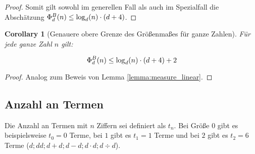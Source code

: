 \documentclass{article}
\newtheorem{corollary}{Corollary}[theorem]
\theoremstyle{nonumberplain}
\newtheorem{proof}{Beweis}
\begin{document}
\begin{proof}
Somit gilt sowohl im generellen Fall als auch im Spezialfall die Abschätzung \(\Phi_{d}^{B}(n) \leq \log_d(n) \cdot (d+4)\).
\end{proof}

\begin{corollary}[Genauere obere Grenze des Größenmaßes für ganze Zahlen]\label{corollary:phi_bound}
    Für jede ganze Zahl \(n\) gilt:
    
        \[\Phi_{d}^{B}(n) \leq \log_d(n) \cdot (d+4) + 2\]
\end{corollary}
\begin{proof}
    Analog zum Beweis von Lemma \ref{lemma:measure_linear}.
\end{proof}

\subsection{Anzahl an Termen}

Die Anzahl an Termen mit \(n\) Ziffern sei definiert als \(t_n\).
Bei Größe \(0\) gibt es beispielsweise \(t_0 = 0\) Terme, bei \(1\) gibt es \(t_1 = 1\) Terme und bei \(2\) gibt es \(t_2 = 6\) Terme (\(d; dd; d+d; d-d; d \cdot d; d \div d\)).
\end{document}

